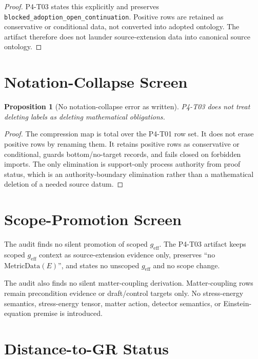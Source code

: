 \documentclass[11pt]{article}
\newcommand{\MetricData}{\mathrm{MetricData}}
\newcommand{\geff}{g_{\mathrm{eff}}}
\newtheorem{proposition}{Proposition}
\begin{document}
\begin{proof}
P4-T03 states this explicitly and preserves
\texttt{blocked\_adoption\_open\_continuation}. Positive rows are retained as
conservative or conditional data, not converted into adopted ontology. The
artifact therefore does not launder source-extension data into canonical
source ontology.
\end{proof}

\section{Notation-Collapse Screen}

\begin{proposition}[No notation-collapse error as written]
P4-T03 does not treat deleting labels as deleting mathematical obligations.
\end{proposition}

\begin{proof}
The compression map is total over the P4-T01 row set. It does not erase
positive rows by renaming them. It retains positive rows as conservative or
conditional, guards bottom/no-target records, and fails closed on forbidden
imports. The only elimination is support-only process authority from proof
status, which is an authority-boundary elimination rather than a mathematical
deletion of a needed source datum.
\end{proof}

\section{Scope-Promotion Screen}

The audit finds no silent promotion of scoped \(\geff\). The P4-T03 artifact
keeps scoped \(\geff\) context as source-extension evidence only, preserves
``no \(\MetricData(E)\)'', and states no unscoped \(\geff\) and no scope
change.

The audit also finds no silent matter-coupling derivation. Matter-coupling
rows remain precondition evidence or draft/control targets only. No
stress-energy semantics, stress-energy tensor, matter action, detector
semantics, or Einstein-equation premise is introduced.

\section{Distance-to-GR Status}
\end{document}
